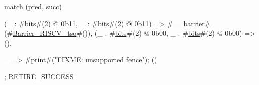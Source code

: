 match (pred, succ) {
  (_ : #\hyperref[sailRISCVzbits]{bits}#(2) @ 0b11, _ : #\hyperref[sailRISCVzbits]{bits}#(2) @ 0b11) => #\hyperref[sailRISCVzzyzybarrier]{\_\_barrier}#(#\hyperref[sailRISCVzBarrierzyRISCVzytso]{Barrier\_RISCV\_tso}#()),
  (_ : #\hyperref[sailRISCVzbits]{bits}#(2) @ 0b00, _ : #\hyperref[sailRISCVzbits]{bits}#(2) @ 0b00) => (),

  _ => { #\hyperref[sailRISCVzprint]{print}#("FIXME: unsupported fence");
         () }
};
RETIRE_SUCCESS
